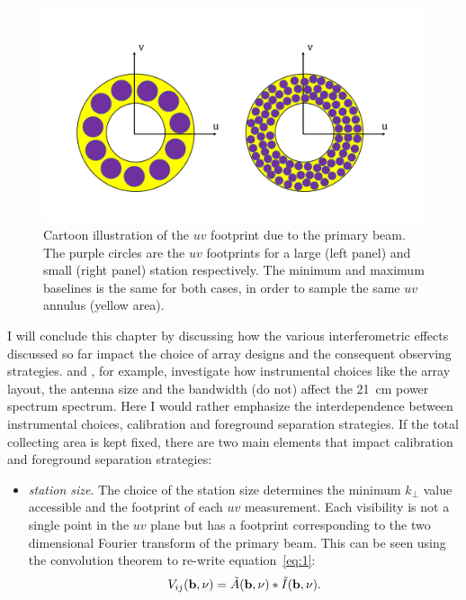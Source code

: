 {\begin{figure}[]
\begin{center}
\includegraphics[width=1.\textwidth]{Bernardi/uv_footprint_1}
\end{center}
\caption{Cartoon illustration of the $uv$ footprint due to the primary beam. The purple circles are the $uv$ footprints for a large (left panel) and small (right panel) station respectively. The minimum and maximum baselines is the same for both cases, in order to sample the same $uv$ annulus (yellow area).}
\label{fig:fig6}
\end{figure}
I will conclude this chapter by discussing how the various interferometric effects discussed so far impact the choice of array designs and the consequent observing strategies. \cite{morales05} and \cite{parsons12b}, for example, investigate how instrumental choices like the array layout, the antenna size and the bandwidth (do not) affect the 21~cm power spectrum spectrum. Here I would rather emphasize the interdependence between instrumental choices, calibration and foreground separation strategies. If the total collecting area is kept fixed, there are two main elements that impact calibration and foreground separation strategies:
\begin{itemize}
\item {\it station size}. The choice of the station size determines the minimum $k_\perp$ value accessible and the footprint of each $uv$ measurement. Each visibility is not a single point in the $uv$ plane but has a footprint corresponding to the two dimensional Fourier transform of the primary beam. This can be seen using the convolution theorem to re-write equation~\ref{eq:1}: \begin{equation}
V_{ij} ({\bf b}, \nu) = \tilde{A} ({\bf b}, \nu) \ast \tilde{I} ({\bf b}, \nu).
\end{equation}

\end{itemize}}

